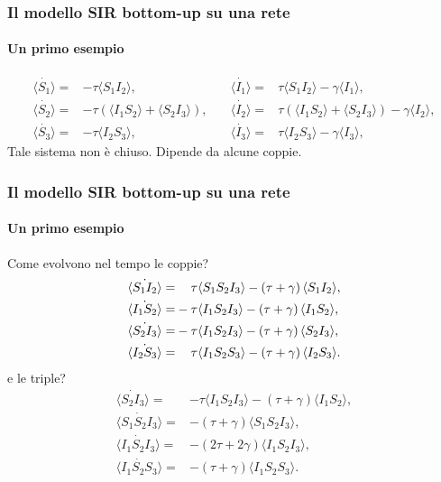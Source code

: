 \documentclass{beamer}
\newcommand{\spa}{\mathbin{\textcolor{white}{-}}}
\newcommand{\angol}[1]{\langle #1 \rangle}
\newcommand{\tonde}[1]{\left( #1 \right)}
\theoremstyle{definition}
\theoremstyle{plain}
\begin{document}
\begin{frame}
    \frametitle{Il modello SIR bottom-up su una rete}
\framesubtitle{Un primo esempio}
\begin{equation*}
\begin{aligned}
	\dot{\angol {S_1}} = & -\tau \angol{ S_1 I_2}, 
\quad &
	\dot{\angol {I_1}} = & \tau \angol{S_1 I_2}-\gamma \angol{I_1}, 
\\
	\dot{\angol {S_2}} = & -\tau \tonde{ \angol{ I_1 S_2} + \angol{S_2I_3}},	
\quad & 
	\dot{\angol {I_2}} = & \tau \tonde{ \angol{ I_1 S_2} + \angol{S_2I_3}}-\gamma \angol{I_2},
\\
	\dot{\angol {S_3}} = & -\tau \angol{ I_2 S_3},
\quad & 
	\dot{\angol {I_3}} = & \tau \angol{ I_2 S_3}-\gamma \angol{I_3},
\end{aligned}
\end{equation*}
\pause
Tale sistema \alert{non \`e chiuso}. Dipende da alcune coppie. 
\end{frame}
\begin{frame}
\frametitle{Il modello SIR bottom-up su una rete}
\framesubtitle{Un primo esempio}
Come evolvono nel tempo le coppie?
    \begin{equation*}
\begin{aligned}
	\dot{\angol{S_1I_2}}=&\spa\tau\angol{S_1S_2I_3} - \tonde{ \tau + \gamma}\angol{S_1 I_2},
\\
	\dot{\angol{I_1S_2}}=&-\tau\angol{I_1S_2I_3} - \tonde{ \tau + \gamma}\angol{I_1 S_2},
\\
	\dot{\angol{S_2I_3}}=&-\tau\angol{I_1S_2I_3} - \tonde{ \tau + \gamma}\angol{S_2 I_3},
\\
	\dot{\angol{I_2S_3}}=&\spa\tau\angol{I_1S_2S_3} - \tonde{ \tau + \gamma}\angol{I_2 S_3}.
	\end{aligned}
\end{equation*}
e le triple?
\begin{equation*}
    \begin{aligned}
        \dot{\angol{S_2I_3}}=&-\tau\angol{I_1S_2I_3} - \tonde{ \tau + \gamma}\angol{I_1 S_2},
\\
	\dot{\angol{S_1S_2I_3}}=&-\tonde{\tau + \gamma}\angol{S_1S_2I_3},
\\
	\dot{\angol{I_1S_2I_3}}=&-\tonde{2\tau + 2\gamma}\angol{I_1S_2I_3},
\\
	\dot{\angol{I_1S_2S_3}}=&-\tonde{\tau + \gamma}\angol{I_1S_2S_3}.
 \end{aligned}
\end{equation*}
\end{frame}
\end{document}
